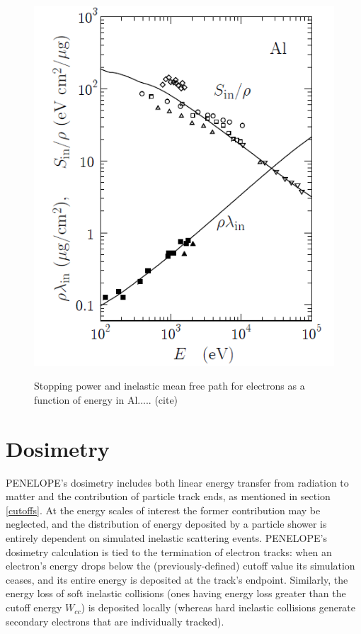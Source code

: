 \documentclass [11pt, proquest, article] {uwthesis}[2016/11/22]
\begin{document}
\begin{figure}[h] 
\caption{Stopping power and inelastic mean free path for electrons as a function of energy in Al..... (cite)}
\centering
\includegraphics[scale=0.7]{../Figures/penelope_3_11.png}
\label{fig:stp_accuracy}
\end{figure}

\section{Dosimetry}
PENELOPE's dosimetry includes both linear energy transfer from radiation to matter and the contribution of particle track ends, as mentioned in section \ref{cutoffs}. At the energy scales of interest the former contribution may be neglected, and the distribution of energy deposited by a particle shower is entirely dependent on simulated inelastic scattering events. PENELOPE's dosimetry calculation is tied to the termination of electron tracks: when an electron's energy drops below the (previously-defined) cutoff value its simulation ceases, and its entire energy is deposited at the track's endpoint.  Similarly, the energy loss of soft inelastic collisions (ones having energy loss greater than the cutoff energy $W_{cc}$) is deposited locally (whereas hard inelastic collisions generate secondary electrons that are individually tracked). 
\end{document}

